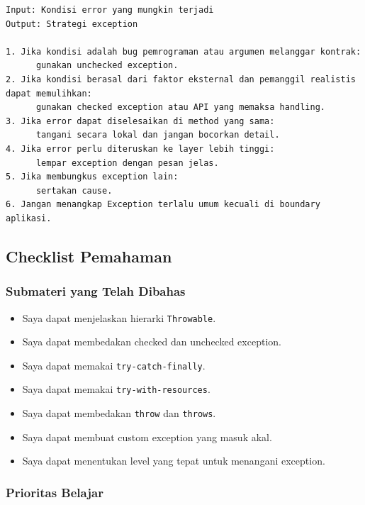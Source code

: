 \begin{lstlisting}[caption={Pseudocode pemilihan exception}, label={lst:exception-choice}]
Input: Kondisi error yang mungkin terjadi
Output: Strategi exception

1. Jika kondisi adalah bug pemrograman atau argumen melanggar kontrak:
      gunakan unchecked exception.
2. Jika kondisi berasal dari faktor eksternal dan pemanggil realistis dapat memulihkan:
      gunakan checked exception atau API yang memaksa handling.
3. Jika error dapat diselesaikan di method yang sama:
      tangani secara lokal dan jangan bocorkan detail.
4. Jika error perlu diteruskan ke layer lebih tinggi:
      lempar exception dengan pesan jelas.
5. Jika membungkus exception lain:
      sertakan cause.
6. Jangan menangkap Exception terlalu umum kecuali di boundary aplikasi.
\end{lstlisting}

\subsection{Checklist Pemahaman}

\subsubsection{Submateri yang Telah Dibahas}

\begin{itemize}
    \item[$\square$] Saya dapat menjelaskan hierarki \texttt{Throwable}.
    \item[$\square$] Saya dapat membedakan checked dan unchecked exception.
    \item[$\square$] Saya dapat memakai \texttt{try-catch-finally}.
    \item[$\square$] Saya dapat memakai \texttt{try-with-resources}.
    \item[$\square$] Saya dapat membedakan \texttt{throw} dan \texttt{throws}.
    \item[$\square$] Saya dapat membuat custom exception yang masuk akal.
    \item[$\square$] Saya dapat menentukan level yang tepat untuk menangani exception.
\end{itemize}

\subsubsection{Prioritas Belajar}

